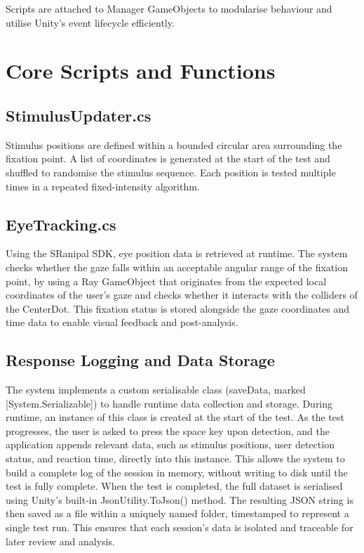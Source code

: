 \documentclass{l4proj}
\begin{document}
Scripts are attached to Manager GameObjects to modularise behaviour and utilise Unity’s event lifecycle efficiently.

\section{Core Scripts and Functions}

\subsection{StimulusUpdater.cs}
Stimulus positions are defined within a bounded circular area surrounding the fixation point. A list of coordinates is generated at the start of the test and shuffled to randomise the stimulus sequence. Each position is tested multiple times in a repeated fixed-intensity algorithm.

\subsection{EyeTracking.cs}
Using the SRanipal SDK, eye position data is retrieved at runtime. The system checks whether the gaze falls within an acceptable angular range of the fixation point, by using a Ray GameObject that originates from the expected local coordinates of the user's gaze and checks whether it interacts with the colliders of the CenterDot. This fixation status is stored alongside the gaze coordinates and time data to enable visual feedback and post-analysis.

\subsection{Response Logging and Data Storage}
The system implements a custom serialisable class (saveData, marked [System.Serializable]) to handle runtime data collection and storage. During runtime, an instance of this class is created at the start of the test. As the test progresses, the user is asked to press the space key upon detection, and the application appends relevant data, such as stimulus positions, user detection status, and reaction time, directly into this instance. This allows the system to build a complete log of the session in memory, without writing to disk until the test is fully complete. When the test is completed, the full dataset is serialised using Unity’s built-in JsonUtility.ToJson() method. The resulting JSON string is then saved as a file within a uniquely named folder, timestamped to represent a single test run. This ensures that each session's data is isolated and traceable for later review and analysis. 
\end{document}
